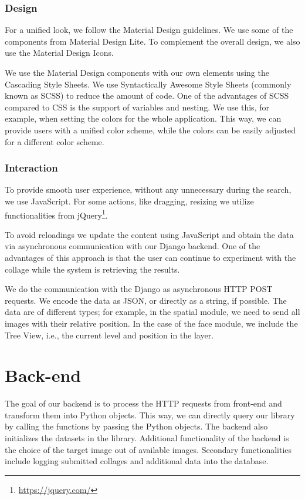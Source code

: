 \subsubsection*{Design}
For a unified look, we follow the Material Design guidelines. We use some of the components from Material Design Lite. To complement the overall design, we also use the Material Design Icons.

We use the Material Design components with our own elements using the Cascading Style Sheets. We use Syntactically Awesome Style Sheets (commonly known as SCSS) to reduce the amount of code. One of the advantages of SCSS compared to CSS is the support of variables and nesting. We use this, for example, when setting the colors for the whole application. This way, we can provide users with a unified color scheme, while the colors can be easily adjusted for a different color scheme.

\subsubsection*{Interaction}

To provide smooth user experience, without any unnecessary during the search, we use JavaScript. For some actions, like dragging, resizing we utilize functionalities from jQuery\footnote{\url{https://jquery.com/}}. 

To avoid reloadings we update the content using JavaScript and obtain the data via asynchronous communication with our Django backend. One of the advantages of this approach is that the user can continue to experiment with the collage while the system is retrieving the results.

We do the communication with the Django as asynchronous HTTP POST requests. We encode the data as JSON, or directly as a string, if possible. The data are of different types; for example, in the spatial module, we need to send all images with their relative position. In the case of the face module, we include the Tree View, i.e., the current level and position in the layer.

\section{Back-end}

The goal of our backend is to process the HTTP requests from front-end and transform them into Python objects. This way, we can directly query our library by calling the functions by passing the Python objects. The backend also initializes the datasets in the library. Additional functionality of the backend is the choice of the target image out of available images. Secondary functionalities include logging submitted collages and additional data into the database.

